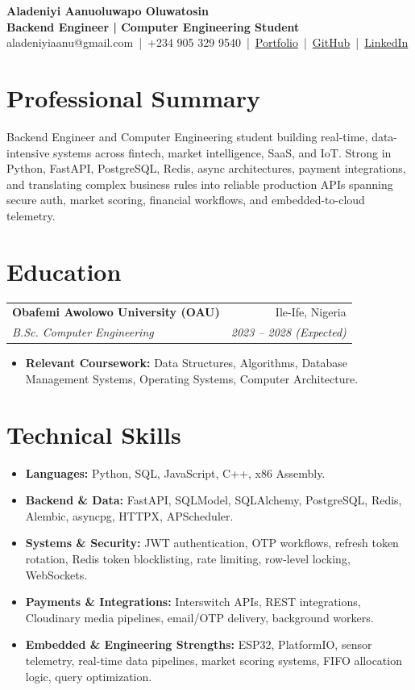 \documentclass[10pt, letterpaper]{article}
\newcommand{\resumeItem}[1]{\item #1}
\newcommand{\resumeSubheading}[4]{
    \begin{tabularx}{\textwidth}{Xr}
        \textbf{#1} & #2 \\
        \textit{#3} & \textit{#4} \\
    \end{tabularx}
}
\begin{document}
\begin{center}
    {\Huge \textbf{Aladeniyi Aanuoluwapo Oluwatosin}} \\
    \vspace{4pt}
    \textbf{Backend Engineer | Computer Engineering Student} \\
    \vspace{4pt}
    aladeniyiaanu@gmail.com \,|\, +234 905 329 9540 \,|\, \href{https://www.aladeniyiaanu.dev/}{Portfolio} \,|\, \href{https://github.com/Anjola11}{GitHub} \,|\, \href{https://www.linkedin.com/in/aladeniyi-aanu/}{LinkedIn}
\end{center}

\section{Professional Summary}
Backend Engineer and Computer Engineering student building real-time, data-intensive systems across fintech, market intelligence, SaaS, and IoT. Strong in Python, FastAPI, PostgreSQL, Redis, async architectures, payment integrations, and translating complex business rules into reliable production APIs spanning secure auth, market scoring, financial workflows, and embedded-to-cloud telemetry.

\section{Education}
\resumeSubheading
    {Obafemi Awolowo University (OAU)}{Ile-Ife, Nigeria}
    {B.Sc. Computer Engineering}{2023 -- 2028 (Expected)}
\begin{itemize}[leftmargin=0.15in, itemsep=1pt, topsep=2pt]
    \resumeItem{\textbf{Relevant Coursework:} Data Structures, Algorithms, Database Management Systems, Operating Systems, Computer Architecture.}
\end{itemize}

\section{Technical Skills}
\begin{itemize}[leftmargin=0.15in, itemsep=1pt, topsep=2pt]
    \resumeItem{\textbf{Languages:} Python, SQL, JavaScript, C++, x86 Assembly.}
    \resumeItem{\textbf{Backend \& Data:} FastAPI, SQLModel, SQLAlchemy, PostgreSQL, Redis, Alembic, asyncpg, HTTPX, APScheduler.}
    \resumeItem{\textbf{Systems \& Security:} JWT authentication, OTP workflows, refresh token rotation, Redis token blocklisting, rate limiting, row-level locking, WebSockets.}
    \resumeItem{\textbf{Payments \& Integrations:} Interswitch APIs, REST integrations, Cloudinary media pipelines, email/OTP delivery, background workers.}
    \resumeItem{\textbf{Embedded \& Engineering Strengths:} ESP32, PlatformIO, sensor telemetry, real-time data pipelines, market scoring systems, FIFO allocation logic, query optimization.}
\end{itemize}
\end{document}
